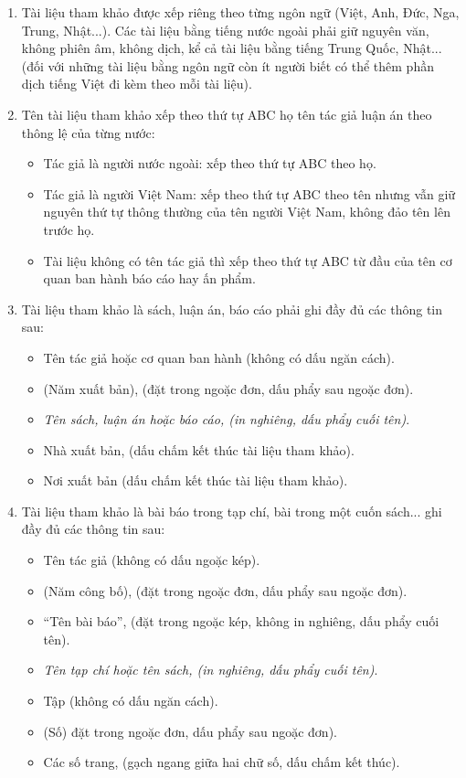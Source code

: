\begin{enumerate}
	\item Tài liệu tham khảo được xếp riêng theo từng ngôn ngữ (Việt, Anh, Đức, Nga, Trung, Nhật...). Các tài liệu bằng tiếng nước ngoài phải giữ nguyên văn, không phiên âm, không dịch, kể cả tài liệu bằng tiếng Trung Quốc, Nhật... (đối với những tài liệu bằng ngôn ngữ còn ít người biết có thể thêm phần dịch tiếng Việt đi kèm theo mỗi tài liệu).
	\item Tên tài liệu tham khảo xếp theo thứ tự ABC họ tên tác giả luận án theo thông lệ của từng nước:
	\begin{itemize}
		\item Tác giả là người nước ngoài: xếp theo thứ tự ABC theo họ.
		\item Tác giả là người Việt Nam: xếp theo thứ tự ABC theo tên nhưng vẫn giữ nguyên thứ tự thông thường của tên người Việt Nam, không đảo tên lên trước họ.
		\item Tài liệu không có tên tác giả thì xếp theo thứ tự ABC từ đầu của tên cơ quan ban hành báo cáo hay ấn phẩm.
	\end{itemize}
	\item Tài liệu tham khảo là sách, luận án, báo cáo phải ghi đầy đủ các thông tin sau:
	\begin{itemize}
		\item Tên tác giả hoặc cơ quan ban hành (không có dấu ngăn cách).
		\item (Năm xuất bản), (đặt trong ngoặc đơn, dấu phẩy sau ngoặc đơn).
		\item \textit{Tên sách, luận án hoặc báo cáo,  (in nghiêng, dấu phẩy cuối tên)}.
		\item Nhà xuất bản, (dấu chấm kết thúc tài liệu tham khảo).
		\item Nơi xuất bản (dấu chấm kết thúc tài liệu tham khảo).
	\end{itemize}
	\item Tài liệu tham khảo là bài báo trong tạp chí, bài trong một cuốn sách...  ghi đầy đủ các thông tin sau:
	\begin{itemize}
		\item Tên tác giả (không có dấu ngoặc kép).
		\item (Năm công bố), (đặt trong ngoặc đơn, dấu phẩy sau ngoặc đơn).
		\item “Tên bài báo”, (đặt trong ngoặc kép, không in nghiêng, dấu phẩy cuối tên).
		\item \textit{Tên tạp chí hoặc tên sách, (in nghiêng, dấu phẩy cuối tên)}.
		\item Tập (không có dấu ngăn cách).
		\item (Số) đặt trong ngoặc đơn, dấu phẩy sau ngoặc đơn).
		\item Các số trang, (gạch ngang giữa hai chữ số, dấu chấm kết thúc).
	\end{itemize}
\end{enumerate}

